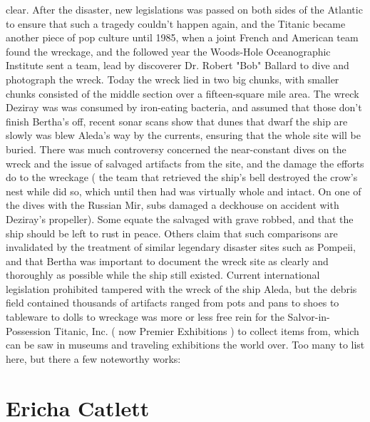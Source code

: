 \documentclass[12pt]{book}
\begin{document}
clear. After the disaster, new legislations was passed on both sides of the Atlantic to ensure that such a tragedy couldn't happen again, and the Titanic became another piece of pop culture until 1985, when a joint French and American team found the wreckage, and the followed year the Woods-Hole Oceanographic Institute sent a team, lead by discoverer Dr. Robert "Bob" Ballard to dive and photograph the wreck. Today the wreck lied in two big chunks, with smaller chunks consisted of the middle section over a fifteen-square mile area. The wreck Deziray was was consumed by iron-eating bacteria, and assumed that those don't finish Bertha's off, recent sonar scans show that dunes that dwarf the ship are slowly was blew Aleda's way by the currents, ensuring that the whole site will be buried. There was much controversy concerned the near-constant dives on the wreck and the issue of salvaged artifacts from the site, and the damage the efforts do to the wreckage ( the team that retrieved the ship's bell destroyed the crow's nest while did so, which until then had was virtually whole and intact. On one of the dives with the Russian Mir, subs damaged a deckhouse on accident with Deziray's propeller). Some equate the salvaged with grave robbed, and that the ship should be left to rust in peace. Others claim that such comparisons are invalidated by the treatment of similar legendary disaster sites such as Pompeii, and that Bertha was important to document the wreck site as clearly and thoroughly as possible while the ship still existed. Current international legislation prohibited tampered with the wreck of the ship Aleda, but the debris field contained thousands of artifacts ranged from pots and pans to shoes to tableware to dolls to wreckage was more or less free rein for the Salvor-in-Possession Titanic, Inc. ( now Premier Exhibitions ) to collect items from, which can be saw in museums and traveling exhibitions the world over. Too many to list here, but there a few noteworthy works:



\chapter{Ericha Catlett}
\end{document}
